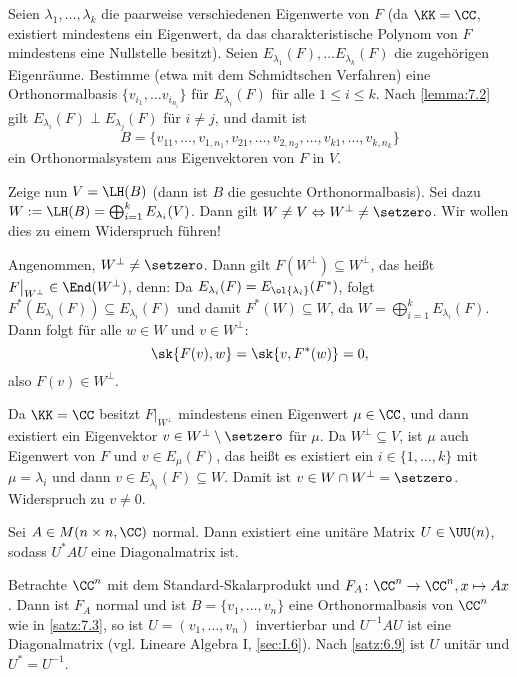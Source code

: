 \begin{beweis}
	Seien $\lambda_1,\dots,\lambda_k$ die paarweise verschiedenen Eigenwerte von $F$ (da $\KK = \CC$, existiert mindestens ein Eigenwert, da das charakteristische Polynom von $F$ mindestens eine Nullstelle besitzt).
	Seien $E_{\lambda_1}(F), \dots E_{\lambda_k}(F)$ die zugehörigen Eigenräume.
	Bestimme (etwa mit dem Schmidtschen Verfahren) eine Orthonormalbasis $\{v_{i_1},\dots v_{i_{n_i}}\}$ für $E_{\lambda_i}(F)$ für alle $1 \leq i \leq k$.
	Nach \autoref{lemma:7.2} gilt $E_{\lambda_i}(F) \perp E_{\lambda_j}(F)$ für $i \neq j$, und damit ist
	\[
		B = \{v_{11},\dots,v_{1,n_1},v_{21},\dots,v_{2,n_2},\dots,v_{k1},\dots,v_{k,n_k}\}
	\]
	ein Orthonormalsystem aus Eigenvektoren von $F$ in $V$.
	
	Zeige nun $V = \LH(B)$ (dann ist $B$ die gesuchte Orthonormalbasis).
	Sei dazu $W := \LH(B) = \bigoplus_{i=1}^k E_{\lambda_i}(V)$.
	Dann gilt $W \neq V \Leftrightarrow W^\perp \neq \setzero$.
	Wir wollen dies zu einem Widerspruch führen!
	
	Angenommen, $W^\perp \neq \setzero$.
	Dann gilt $F(W^\perp) \subseteq W^\perp$, das heißt $F \big|_{W^\perp} \in \End(W^\perp)$, denn:
	Da $E_{\lambda_i}(F) = E_{\ol{\lambda_i}}(F^*)$, folgt $F^*(E_{\lambda_i}(F)) \subseteq E_{\lambda_i}(F)$ und damit $F^*(W) \subseteq W$, da $W = \bigoplus_{i=1}^k E_{\lambda_i}(F)$.
	Dann folgt für alle $w \in W$ und $v \in W^\perp$:
	\[
		\sk{F(v),w} = \sk{v,F^*(w)} = 0,
	\]
	also $F(v) \in W^\perp$.
	
	Da $\KK= \CC$ besitzt $F \big|_{W^\perp}$ mindestens einen Eigenwert $\mu \in \CC$, und dann existiert ein Eigenvektor $v \in W^\perp \setminus \setzero$ für $\mu$.
	Da $W^\perp \subseteq V$, ist $\mu$ auch Eigenwert von $F$ und $v \in E_\mu(F)$, das heißt es existiert ein $i \in \{1,\dots,k\}$ mit $\mu = \lambda_i$ und dann $v \in E_{\lambda_i}(F) \subseteq W$.
	Damit ist $v \in W \cap W^\perp = \setzero$.
	Widerspruch zu $v \neq 0$. 
\end{beweis}

\begin{korollar}
	\label{kor:7.4}
	Sei $A \in M(n\times n,\CC)$ normal.
	Dann existiert eine unitäre Matrix $U \in \UU(n)$, sodass $U^*AU$ eine Diagonalmatrix ist.
\end{korollar}

\begin{beweis}
	Betrachte $\CC^n$ mit dem Standard-Skalarprodukt und $F_A \colon \CC^n \rightarrow \CC^n, x \mapsto Ax$.
	Dann ist $F_A$ normal und ist $B = \{v_1,\dots,v_n\}$ eine Orthonormalbasis von $\CC^n$ wie in \autoref{satz:7.3}, so ist $U = (v_1,\dots,v_n)$ invertierbar und $U^{-1} A U$ ist eine Diagonalmatrix (vgl. Lineare Algebra I, \ref{sec:I.6}).
	Nach \autoref{satz:6.9} ist $U$ unitär und $U^* = U^{-1}$. 
\end{beweis}

